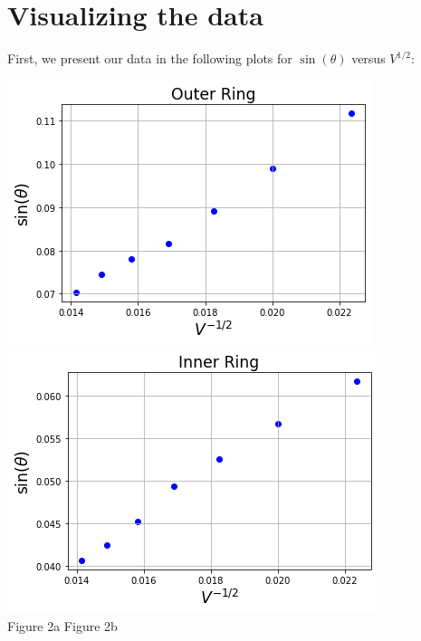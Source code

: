 \documentclass[11pt]{book}
\theoremstyle{break}
\theoremstyle{break}
\begin{document}
\newpage
\section{Visualizing the data}
First, we present our data in the following plots for $\sin(\theta)$ versus $V^{1/2}$:
\begin{center}
\includegraphics[scale=0.55]{Or.png} 
\includegraphics[scale=0.55]{Ir.png}\\
${}$\qquad\quad Figure 2a \qquad\qquad\qquad\qquad\qquad\qquad\qquad\qquad Figure 2b
\end{center}
\hfill\break
\end{document}
